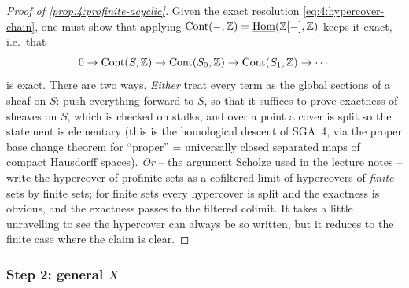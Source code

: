 \begin{proof}[Proof of \cref{prop:4:profinite-acyclic}]
Given the exact resolution \eqref{eq:4:hypercover-chain}, one must show that
applying $\operatorname{Cont}(-,\mathbb{Z})=\underline{\operatorname{Hom}}(\mathbb{Z}[-],\mathbb{Z})$
keeps it exact, i.e.\ that
\begin{equation*}
0\to\operatorname{Cont}(S,\mathbb{Z})\to\operatorname{Cont}(S_0,\mathbb{Z})\to\operatorname{Cont}(S_1,\mathbb{Z})\to\cdots
\end{equation*}
is exact. There are two ways. \emph{Either} treat every term as the global
sections of a sheaf on $S$: push everything forward to $S$, so that it suffices
to prove exactness of sheaves on $S$, which is checked on stalks, and over a
point a cover is split so the statement is elementary (this is the homological
descent of SGA~4, via the proper base change theorem for ``proper'' = universally
closed separated maps of compact Hausdorff spaces). \emph{Or} -- the argument
Scholze used in the lecture notes -- write the hypercover of profinite sets as a
cofiltered limit of hypercovers of \emph{finite} sets by finite sets; for finite
sets every hypercover is split and the exactness is obvious, and the exactness
passes to the filtered colimit. It takes a little unravelling to see the
hypercover can always be so written, but it reduces to the finite case where the
claim is clear.
\end{proof}

\subsubsection*{Step 2: general \texorpdfstring{$X$}{X}}

